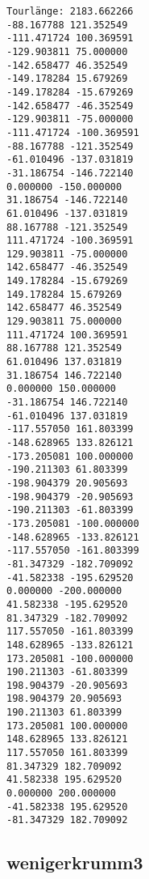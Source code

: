 \documentclass[a4paper, 10pt, ngerman]{article}
\begin{document}
\begin{verbatim}
Tourlänge: 2183.662266
-88.167788 121.352549
-111.471724 100.369591
-129.903811 75.000000
-142.658477 46.352549
-149.178284 15.679269
-149.178284 -15.679269
-142.658477 -46.352549
-129.903811 -75.000000
-111.471724 -100.369591
-88.167788 -121.352549
-61.010496 -137.031819
-31.186754 -146.722140
0.000000 -150.000000
31.186754 -146.722140
61.010496 -137.031819
88.167788 -121.352549
111.471724 -100.369591
129.903811 -75.000000
142.658477 -46.352549
149.178284 -15.679269
149.178284 15.679269
142.658477 46.352549
129.903811 75.000000
111.471724 100.369591
88.167788 121.352549
61.010496 137.031819
31.186754 146.722140
0.000000 150.000000
-31.186754 146.722140
-61.010496 137.031819
-117.557050 161.803399
-148.628965 133.826121
-173.205081 100.000000
-190.211303 61.803399
-198.904379 20.905693
-198.904379 -20.905693
-190.211303 -61.803399
-173.205081 -100.000000
-148.628965 -133.826121
-117.557050 -161.803399
-81.347329 -182.709092
-41.582338 -195.629520
0.000000 -200.000000
41.582338 -195.629520
81.347329 -182.709092
117.557050 -161.803399
148.628965 -133.826121
173.205081 -100.000000
190.211303 -61.803399
198.904379 -20.905693
198.904379 20.905693
190.211303 61.803399
173.205081 100.000000
148.628965 133.826121
117.557050 161.803399
81.347329 182.709092
41.582338 195.629520
0.000000 200.000000
-41.582338 195.629520
-81.347329 182.709092 
\end{verbatim}

\subsection*{wenigerkrumm3}
\end{document}
